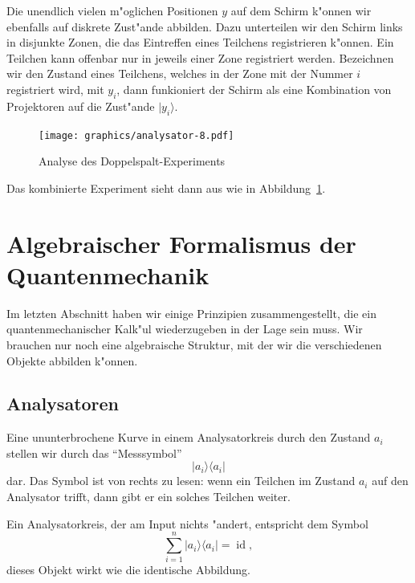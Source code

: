 Die unendlich vielen m"oglichen Positionen $y$ auf dem Schirm
k"onnen wir ebenfalls auf diskrete Zust"ande abbilden.
Dazu unterteilen wir den Schirm links in
disjunkte Zonen, die das Eintreffen eines Teilchens registrieren k"onnen.
Ein Teilchen kann offenbar nur in jeweils einer Zone registriert werden.
Bezeichnen wir den Zustand eines Teilchens, welches in der Zone mit
der Nummer $i$ registriert wird, mit $y_i$, dann funkioniert der Schirm als
eine Kombination von Projektoren auf die Zust"ande $|y_i\rangle$.
\begin{figure}
\centering
\texttt{[image: graphics/analysator-8.pdf]}
\caption{Analyse des Doppelspalt-Experiments
\label{skript:doppelspalt-analyse}}
\end{figure}
Das kombinierte Experiment sieht dann aus wie in
Abbildung~\ref{skript:doppelspalt-analyse}.

\section{Algebraischer Formalismus der Quantenmechanik}
Im letzten Abschnitt haben wir einige Prinzipien zusammengestellt,
die ein quantenmechanischer Kalk"ul wiederzugeben in der Lage sein muss.
Wir brauchen nur noch eine algebraische Struktur, mit der wir die 
verschiedenen Objekte abbilden k"onnen.

\subsection{Analysatoren}
Eine ununterbrochene Kurve in einem Analysatorkreis durch den Zustand
$a_i$ stellen wir durch das ``Messsymbol'' 
\[
|a_i\rangle\langle a_i|
\]
dar. Das Symbol ist von rechts zu lesen: wenn ein Teilchen
im Zustand $a_i$ auf den Analysator trifft, dann gibt er ein solches
Teilchen weiter.

Ein Analysatorkreis, der am Input nichts "andert, entspricht dem Symbol
\[
\sum_{i=1}^n |a_i\rangle \langle a_i|=\operatorname{id},
\]
dieses Objekt wirkt wie die identische Abbildung.

